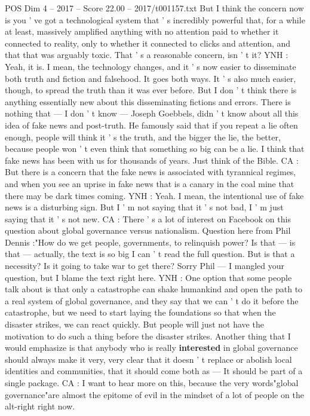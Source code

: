 \begin{textsample}{POS Dim 4 – 2017 – Score 22.00 – 2017/t001157.txt}
But I think the concern now is you ' ve got a technological system that ' s incredibly powerful that, for a while at least, massively amplified anything with no attention paid to whether it connected to reality, only to whether it connected to clicks and attention, and that that was arguably toxic.
That ' s a reasonable concern, isn ' t it?
YNH : Yeah, it is.
I mean, the technology changes, and it ' s now easier to disseminate both truth and fiction and falsehood.
It goes both ways.
It ' s also much easier, though, to spread the truth than it was ever before.
But I don ' t think there is anything essentially new about this disseminating fictions and errors.
There is nothing that — I don ' t know — Joseph Goebbels, didn ' t know about all this idea of fake news and post-truth.
He famously said that if you repeat a lie often enough, people will think it ' s the truth, and the bigger the lie, the better, because people won ' t even think that something so big can be a lie.
I think that fake news has been with us for thousands of years.
Just think of the Bible.
CA : But there is a concern that the fake news is associated with tyrannical regimes, and when you see an uprise in fake news that is a canary in the coal mine that there may be dark times coming.
YNH : Yeah.
I mean, the intentional use of fake news is a disturbing sign.
But I ' m not saying that it ' s not bad, I ' m just saying that it ' s not new.
CA : There ' s a lot of interest on Facebook on this question about global governance versus nationalism.
Question here from Phil Dennis :"How do we get people, governments, to relinquish power?
Is that — is that — actually, the text is so big I can ' t read the full question.
But is that a necessity?
Is it going to take war to get there?
Sorry Phil — I mangled your question, but I blame the text right here.
YNH : One option that some people talk about is that only a catastrophe can shake humankind and open the path to a real system of global governance, and they say that we can ' t do it before the catastrophe, but we need to start laying the foundations so that when the disaster strikes, we can react quickly.
But people will just not have the motivation to do such a thing before the disaster strikes.
Another thing that I would emphasize is that anybody who is really \textbf{interested} in global governance should always make it very, very clear that it doesn ' t replace or abolish local identities and communities, that it should come both as — It should be part of a single package.
CA : I want to hear more on this, because the very words"global governance"are almost the epitome of evil in the mindset of a lot of people on the alt-right right now.

\end{textsample}
